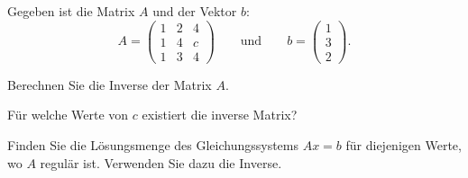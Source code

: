Gegeben ist die Matrix $A$ und der Vektor $b$:
\[
A
=
\begin{pmatrix}
1&2&4\\
1&4&c\\
1&3&4
\end{pmatrix}
\qquad
\text{und}
\qquad
b=\begin{pmatrix}1\\3\\2\end{pmatrix}.
\]
\begin{teilaufgaben}
\item
Berechnen Sie die Inverse der Matrix $A$.
\item
Für welche Werte von $c$ existiert die inverse Matrix?
\item
Finden Sie die Lösungsmenge des Gleichungssystems $Ax=b$ für diejenigen
Werte, wo $A$ regulär ist. Verwenden Sie dazu die Inverse.
\end{teilaufgaben}


